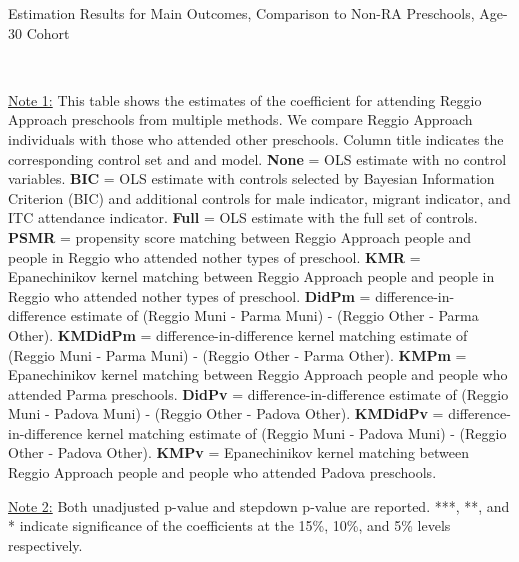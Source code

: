 \begin{table}[H] \caption{Estimation Results for Main Outcomes, Comparison to Non-RA Preschools, Age-30 Cohort} \label{ols-M-adult30-reg-pres}
\scalebox{0.6}{}
\vspace{1ex} \\
\footnotesize\raggedright{\underline{Note 1:} This table shows the estimates of the coefficient for attending Reggio Approach preschools from multiple methods. We compare Reggio Approach individuals with those who attended other preschools. Column title indicates the corresponding control set and and model. \textbf{None} = OLS estimate with no control variables. \textbf{BIC} = OLS estimate with controls selected by Bayesian Information Criterion (BIC) and additional controls for male indicator, migrant indicator, and ITC attendance indicator. \textbf{Full} = OLS estimate with the full set of controls. \textbf{PSMR} =  propensity score matching between Reggio Approach people and people in Reggio who attended nother types of preschool. \textbf{KMR} = Epanechinikov kernel matching between Reggio Approach people and people in Reggio who attended nother types of preschool. \textbf{DidPm} = difference-in-difference estimate of (Reggio Muni - Parma Muni) - (Reggio Other - Parma Other). \textbf{KMDidPm} = difference-in-difference kernel matching estimate of (Reggio Muni - Parma Muni) - (Reggio Other - Parma Other).  \textbf{KMPm} = Epanechinikov kernel matching between Reggio Approach people and people who attended Parma preschools. \textbf{DidPv} = difference-in-difference estimate of (Reggio Muni - Padova Muni) - (Reggio Other - Padova Other). \textbf{KMDidPv} = difference-in-difference kernel matching estimate of (Reggio Muni - Padova Muni) - (Reggio Other - Padova Other).  \textbf{KMPv} = Epanechinikov kernel matching between Reggio Approach people and people who attended Padova preschools.}

\footnotesize\raggedright{\underline{Note 2:} Both unadjusted p-value and stepdown p-value are reported. ***, **, and * indicate significance of the coefficients at the 15\%, 10\%, and 5\% levels respectively.}
\end{table}

